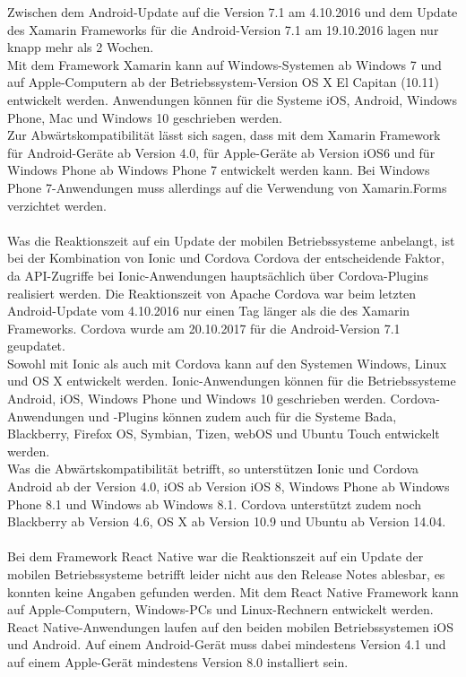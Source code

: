 Zwischen dem Android-Update auf die Version 7.1 am 4.10.2016 und dem Update des Xamarin Frameworks für die Android-Version 7.1 am 19.10.2016 lagen nur knapp mehr als 2 Wochen.
\\
Mit dem Framework Xamarin kann auf Windows-Systemen ab Windows 7 und auf Apple-Computern ab der Betriebssystem-Version OS X El Capitan (10.11) entwickelt werden. Anwendungen können für die Systeme iOS, Android, Windows Phone, Mac und Windows 10 geschrieben werden. 
\\
Zur Abwärtskompatibilität lässt sich sagen, dass mit dem Xamarin Framework für Android-Geräte ab Version 4.0, für Apple-Geräte ab Version iOS6 und für Windows Phone ab Windows Phone 7 entwickelt werden kann. Bei Windows Phone 7-Anwendungen muss allerdings auf die Verwendung von Xamarin.Forms verzichtet werden.
\\
\\
Was die Reaktionszeit auf ein Update der mobilen Betriebssysteme anbelangt, ist bei der Kombination von Ionic und Cordova Cordova der entscheidende Faktor, da API-Zugriffe bei Ionic-Anwendungen hauptsächlich über Cordova-Plugins realisiert werden. Die Reaktionszeit von Apache Cordova war beim letzten Android-Update vom 4.10.2016 nur einen Tag länger als die des Xamarin Frameworks. Cordova wurde am 20.10.2017 für die Android-Version 7.1 geupdatet.
\\
Sowohl mit Ionic als auch mit Cordova kann auf den Systemen Windows, Linux und OS X entwickelt werden. Ionic-Anwendungen können für die Betriebssysteme Android, iOS, Windows Phone und Windows 10 geschrieben werden. Cordova-Anwendungen und -Plugins können zudem auch für die Systeme Bada, Blackberry, Firefox OS, Symbian, Tizen, webOS und Ubuntu Touch entwickelt werden. 
\\
Was die Abwärtskompatibilität betrifft, so unterstützen Ionic und Cordova Android ab der Version 4.0, iOS ab Version iOS 8, Windows Phone ab Windows Phone 8.1 und Windows ab Windows 8.1. Cordova unterstützt zudem noch Blackberry ab Version 4.6, OS X ab Version 10.9 und Ubuntu ab Version 14.04. 
\\
\\
Bei dem Framework React Native war die Reaktionszeit auf ein Update der mobilen Betriebssysteme betrifft leider nicht aus den Release Notes ablesbar, es konnten keine Angaben gefunden werden. Mit dem React Native Framework kann auf Apple-Computern, Windows-PCs und Linux-Rechnern entwickelt werden. React Native-Anwendungen laufen auf den beiden mobilen Betriebssystemen iOS und Android. Auf einem Android-Gerät muss dabei mindestens Version 4.1 und auf einem Apple-Gerät mindestens Version 8.0 installiert sein. 

